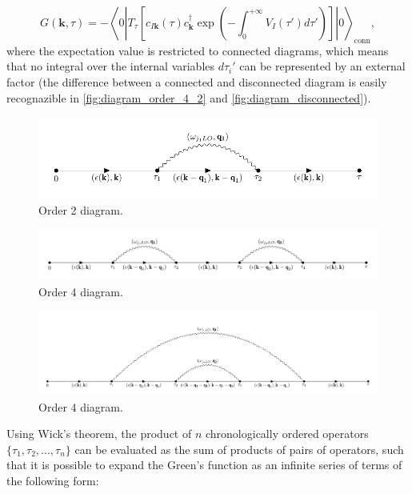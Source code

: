 \begin{equation}
    G(\mathbf{k},\tau)=-\left\langle 0 \left| T_\tau\left[c_{I\mathbf{k}}(\tau)c^\dagger_\mathbf{k}\exp{\left(-\int_0^{+\infty}V_I(\tau')d\tau'\right)}\right]\right|0\right\rangle_{\text{conn}},
\end{equation}
where the expectation value is restricted to connected diagrams, which means that no integral over the internal variables $d\tau_i'$ can be represented 
by an external factor (the difference between a connected and disconnected diagram is easily recognazible in \ref{fig:diagram_order_4_2} and 
\ref{fig:diagram_disconnected}).
\begin{figure}[H]
    \centering
    \includegraphics[scale=0.745]{diagram_order_2.pdf}
    \caption{Order 2 diagram.}
    \label{fig:diagram_order_2}
\end{figure}
\begin{figure}[H]
    \centering
    \includegraphics[scale=0.738]{diagram_order_4_1.pdf}
    \caption{Order 4 diagram.}
    \label{fig:diagram_order_4_1}
\end{figure}
\begin{figure}[H]
    \centering
    \includegraphics[scale=0.58]{diagram_order_4_3.pdf}
    \caption{Order 4 diagram.}
    \label{fig:diagram_order_4_3}
\end{figure}
Using Wick's theorem, the product of $n$ chronologically ordered operators $\{\tau_1,\tau_2,...,\tau_n\}$ can be evaluated as the sum 
of products of pairs of operators, such that it is possible to expand the Green's function as an infinite series of terms of the following form:
